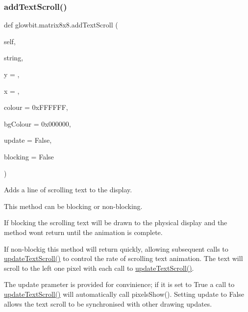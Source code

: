 \subsubsection{\texorpdfstring{add\+Text\+Scroll()}{addTextScroll()}}
{\footnotesize\ttfamily def glowbit.\+matrix8x8.\+add\+Text\+Scroll (\begin{DoxyParamCaption}\item[{}]{self,  }\item[{}]{string,  }\item[{}]{y = {},  }\item[{}]{x = {},  }\item[{}]{colour = {\ttfamily 0xFFFFFF},  }\item[{}]{bg\+Colour = {\ttfamily 0x000000},  }\item[{}]{update = {\ttfamily False},  }\item[{}]{blocking = {\ttfamily False} }\end{DoxyParamCaption})}



Adds a line of scrolling text to the display. 

This method can be blocking or non-\/blocking.

If blocking the scrolling text will be drawn to the physical display and the method won\textquotesingle{}t return until the animation is complete.

If non-\/blockig this method will return quickly, allowing subsequent calls to \hyperlink{classglowbit_1_1matrix8x8_a4a529f9b42ea95cc0f5dafcb0085d096}{update\+Text\+Scroll()} to control the rate of scrolling text animation. The text will scroll to the left one pixel with each call to \hyperlink{classglowbit_1_1matrix8x8_a4a529f9b42ea95cc0f5dafcb0085d096}{update\+Text\+Scroll()}.

The update prameter is provided for convinience; if it is set to True a call to \hyperlink{classglowbit_1_1matrix8x8_a4a529f9b42ea95cc0f5dafcb0085d096}{update\+Text\+Scroll()} will automatically call pixels\+Show(). Setting update to False allows the text scroll to be synchronised with other drawing updates.


